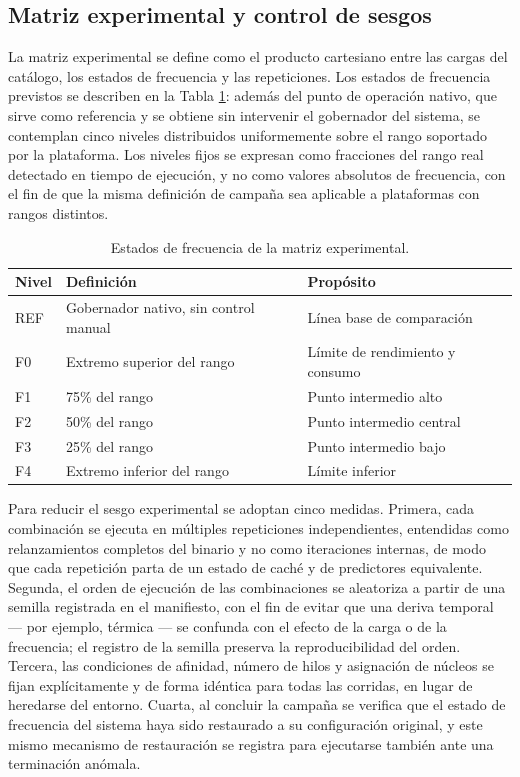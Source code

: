 \documentclass[12pt,oneside,spanish]{book}
\begin{document}
\subsection{Matriz experimental y control de sesgos}

La matriz experimental se define como el producto cartesiano entre las cargas del catálogo, los estados de frecuencia y las repeticiones. Los estados de frecuencia previstos se describen en la Tabla \ref{tab:frecuencias}: además del punto de operación nativo, que sirve como referencia y se obtiene sin intervenir el gobernador del sistema, se contemplan cinco niveles distribuidos uniformemente sobre el rango soportado por la plataforma. Los niveles fijos se expresan como fracciones del rango real detectado en tiempo de ejecución, y no como valores absolutos de frecuencia, con el fin de que la misma definición de campaña sea aplicable a plataformas con rangos distintos.

\begin{table}[H]
\centering
\caption{Estados de frecuencia de la matriz experimental.}
\label{tab:frecuencias}
\begin{tabular}{@{}lll@{}}
\toprule
\textbf{Nivel} & \textbf{Definición} & \textbf{Propósito} \\
\midrule
REF & Gobernador nativo, sin control manual & Línea base de comparación \\
F0 & Extremo superior del rango & Límite de rendimiento y consumo \\
F1 & 75\% del rango & Punto intermedio alto \\
F2 & 50\% del rango & Punto intermedio central \\
F3 & 25\% del rango & Punto intermedio bajo \\
F4 & Extremo inferior del rango & Límite inferior \\
\bottomrule
\end{tabular}
\end{table}

Para reducir el sesgo experimental se adoptan cinco medidas. Primera, cada combinación se ejecuta en múltiples repeticiones independientes, entendidas como relanzamientos completos del binario y no como iteraciones internas, de modo que cada repetición parta de un estado de caché y de predictores equivalente. Segunda, el orden de ejecución de las combinaciones se aleatoriza a partir de una semilla registrada en el manifiesto, con el fin de evitar que una deriva temporal --- por ejemplo, térmica --- se confunda con el efecto de la carga o de la frecuencia; el registro de la semilla preserva la reproducibilidad del orden. Tercera, las condiciones de afinidad, número de hilos y asignación de núcleos se fijan explícitamente y de forma idéntica para todas las corridas, en lugar de heredarse del entorno. Cuarta, al concluir la campaña se verifica que el estado de frecuencia del sistema haya sido restaurado a su configuración original, y este mismo mecanismo de restauración se registra para ejecutarse también ante una terminación anómala.
\end{document}
